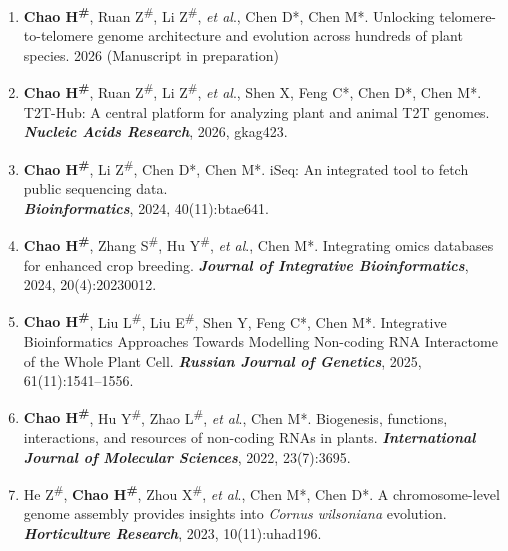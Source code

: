 {\small
\linespread{0.95}\selectfont  %
\begin{enumerate}[leftmargin=*, itemsep=1pt, parsep=0pt, topsep=0pt]

    \item \textbf{Chao H\textsuperscript{\#}}, Ruan Z\textsuperscript{\#}, Li Z\textsuperscript{\#}, \textit{et al}., Chen D*, Chen M*. 
    Unlocking telomere-to-telomere genome architecture and evolution across hundreds of plant species. 
    2026 (Manuscript in preparation)

    \item \textbf{Chao H\textsuperscript{\#}}, Ruan Z\textsuperscript{\#}, Li Z\textsuperscript{\#}, \textit{et al}., Shen X, Feng C*, Chen D*, Chen M*. 
    T2T-Hub: A central platform for analyzing plant and animal T2T genomes. 
    \textbf{\textit{Nucleic Acids Research}}, 2026, gkag423.
     
    \item \textbf{Chao H\textsuperscript{\#}}, Li Z\textsuperscript{\#}, Chen D*, Chen M*. 
    iSeq: An integrated tool to fetch public sequencing data. \\
    \textbf{\textit{Bioinformatics}}, 2024, 40(11):btae641.

    \item \textbf{Chao H\textsuperscript{\#}}, Zhang S\textsuperscript{\#}, Hu Y\textsuperscript{\#}, \textit{et al}., Chen M*. 
    Integrating omics databases for enhanced crop breeding. 
    \textbf{\textit{Journal of Integrative Bioinformatics}}, 2024, 20(4):20230012.

    \item \textbf{Chao H\textsuperscript{\#}}, Liu L\textsuperscript{\#}, Liu E\textsuperscript{\#}, Shen Y, Feng C*, Chen M*. 
    Integrative Bioinformatics Approaches Towards Modelling Non-coding RNA Interactome of the Whole Plant Cell. 
    \textbf{\textit{Russian Journal of Genetics}}, 2025, 61(11):1541--1556.
    
    \item \textbf{Chao H\textsuperscript{\#}}, Hu Y\textsuperscript{\#}, Zhao L\textsuperscript{\#}, \textit{et al}., Chen M*.
    Biogenesis, functions, interactions, and resources of non-coding RNAs in plants. 
    \textbf{\textit{International Journal of Molecular Sciences}}, 2022, 23(7):3695.

    \item He Z\textsuperscript{\#}, \textbf{Chao H\textsuperscript{\#}}, Zhou X\textsuperscript{\#}, \textit{et al}., Chen M*, Chen D*.
    A chromosome-level genome assembly provides insights into \textit{Cornus wilsoniana} evolution.
    \textbf{\textit{Horticulture Research}}, 2023, 10(11):uhad196.


\end{enumerate}}
